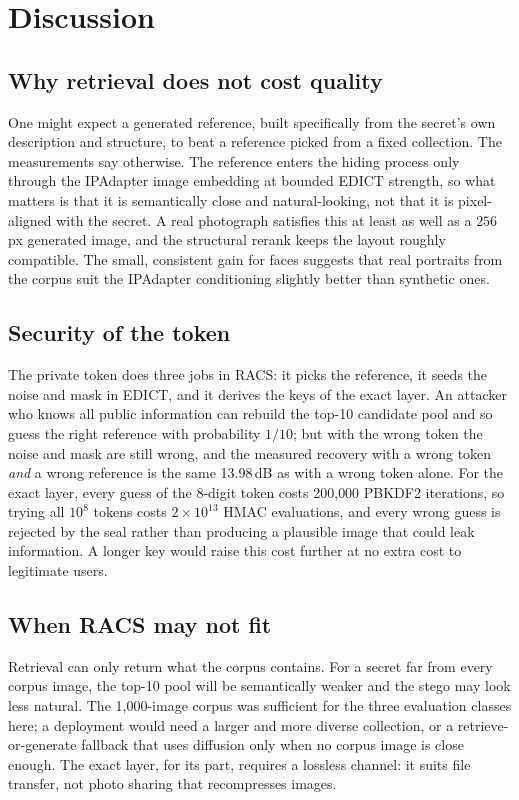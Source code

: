 \section{Discussion}
\subsection{Why retrieval does not cost quality}
One might expect a generated reference, built specifically from the secret's own description and
structure, to beat a reference picked from a fixed collection. The measurements say otherwise.
The reference enters the hiding process only through the IPAdapter image embedding at bounded
EDICT strength, so what matters is that it is semantically close and natural-looking, not that it
is pixel-aligned with the secret. A real photograph satisfies this at least as well as a
$256$\,px generated image, and the structural rerank keeps the layout roughly compatible. The
small, consistent gain for faces suggests that real portraits from the corpus suit the IPAdapter
conditioning slightly better than synthetic ones.

\subsection{Security of the token}
The private token does three jobs in RACS: it picks the reference, it seeds the noise and mask in
EDICT, and it derives the keys of the exact layer. An attacker who knows all public information can
rebuild the top-10 candidate pool and so guess the right reference with probability $1/10$; but
with the wrong token the noise and mask are still wrong, and the measured recovery with a wrong
token \emph{and} a wrong reference is the same 13.98\,dB as with a wrong token alone. For the exact
layer, every guess of the 8-digit token costs 200{,}000 PBKDF2 iterations, so trying all $10^8$
tokens costs $2\times10^{13}$ HMAC evaluations, and every wrong guess is rejected by the seal
rather than producing a plausible image that could leak information. A longer key would raise
this cost further at no extra cost to legitimate users.

\subsection{When RACS may not fit}
Retrieval can only return what the corpus contains. For a secret far from every corpus image, the
top-10 pool will be semantically weaker and the stego may look less natural. The 1{,}000-image
corpus was sufficient for the three evaluation classes here; a deployment would need a larger and
more diverse collection, or a retrieve-or-generate fallback that uses diffusion only when no corpus
image is close enough. The exact layer, for its part, requires a lossless channel: it suits file
transfer, not photo sharing that recompresses images.

